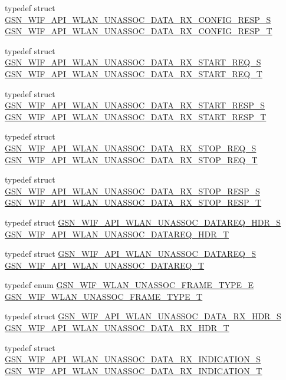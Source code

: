 \begin{DoxyCompactItemize}
\item 
typedef struct \hyperlink{a00307}{GSN\_\-WIF\_\-API\_\-WLAN\_\-UNASSOC\_\-DATA\_\-RX\_\-CONFIG\_\-RESP\_\-S} \hyperlink{a00677_gac8a70ef25878e7678969099ed572c753}{GSN\_\-WIF\_\-API\_\-WLAN\_\-UNASSOC\_\-DATA\_\-RX\_\-CONFIG\_\-RESP\_\-T}
\item 
typedef struct \hyperlink{a00310}{GSN\_\-WIF\_\-API\_\-WLAN\_\-UNASSOC\_\-DATA\_\-RX\_\-START\_\-REQ\_\-S} \hyperlink{a00677_gaecdcd1967f8fbb0ceacd7c88b7e59947}{GSN\_\-WIF\_\-API\_\-WLAN\_\-UNASSOC\_\-DATA\_\-RX\_\-START\_\-REQ\_\-T}
\item 
typedef struct \hyperlink{a00311}{GSN\_\-WIF\_\-API\_\-WLAN\_\-UNASSOC\_\-DATA\_\-RX\_\-START\_\-RESP\_\-S} \hyperlink{a00677_ga95accf920268c313a0e4f7f3e2c1badb}{GSN\_\-WIF\_\-API\_\-WLAN\_\-UNASSOC\_\-DATA\_\-RX\_\-START\_\-RESP\_\-T}
\item 
typedef struct \hyperlink{a00312}{GSN\_\-WIF\_\-API\_\-WLAN\_\-UNASSOC\_\-DATA\_\-RX\_\-STOP\_\-REQ\_\-S} \hyperlink{a00677_gac5ede6da67a0712caac09230fabc842d}{GSN\_\-WIF\_\-API\_\-WLAN\_\-UNASSOC\_\-DATA\_\-RX\_\-STOP\_\-REQ\_\-T}
\item 
typedef struct \hyperlink{a00313}{GSN\_\-WIF\_\-API\_\-WLAN\_\-UNASSOC\_\-DATA\_\-RX\_\-STOP\_\-RESP\_\-S} \hyperlink{a00677_gafa5e88ed5ebe7b8fd34b54650cd38b14}{GSN\_\-WIF\_\-API\_\-WLAN\_\-UNASSOC\_\-DATA\_\-RX\_\-STOP\_\-RESP\_\-T}
\item 
typedef struct \hyperlink{a00314}{GSN\_\-WIF\_\-API\_\-WLAN\_\-UNASSOC\_\-DATAREQ\_\-HDR\_\-S} \hyperlink{a00677_gad488d4cf717d350b9dc7944e43dde197}{GSN\_\-WIF\_\-API\_\-WLAN\_\-UNASSOC\_\-DATAREQ\_\-HDR\_\-T}
\item 
typedef struct \hyperlink{a00315}{GSN\_\-WIF\_\-API\_\-WLAN\_\-UNASSOC\_\-DATAREQ\_\-S} \hyperlink{a00677_gaba0b2d84a922f905d634921a7b54965f}{GSN\_\-WIF\_\-API\_\-WLAN\_\-UNASSOC\_\-DATAREQ\_\-T}
\item 
typedef enum \hyperlink{a00677_ga1b471d184450287e7d0cec7c8d0c4639}{GSN\_\-WIF\_\-WLAN\_\-UNASSOC\_\-FRAME\_\-TYPE\_\-E} \hyperlink{a00677_gad59650e43344fc48d5ecf8cd2f018110}{GSN\_\-WIF\_\-WLAN\_\-UNASSOC\_\-FRAME\_\-TYPE\_\-T}
\item 
typedef struct \hyperlink{a00308}{GSN\_\-WIF\_\-API\_\-WLAN\_\-UNASSOC\_\-DATA\_\-RX\_\-HDR\_\-S} \hyperlink{a00677_ga57b43efb2b44092ec2875db7226c2cc4}{GSN\_\-WIF\_\-API\_\-WLAN\_\-UNASSOC\_\-DATA\_\-RX\_\-HDR\_\-T}
\item 
typedef struct \hyperlink{a00309}{GSN\_\-WIF\_\-API\_\-WLAN\_\-UNASSOC\_\-DATA\_\-RX\_\-INDICATION\_\-S} \hyperlink{a00677_gab8d04ec915313a8e011ff5a106bae33e}{GSN\_\-WIF\_\-API\_\-WLAN\_\-UNASSOC\_\-DATA\_\-RX\_\-INDICATION\_\-T}

\end{DoxyCompactItemize}
